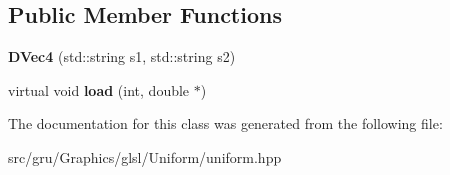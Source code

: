 \subsection*{\-Public \-Member \-Functions}
\begin{DoxyCompactItemize}
\item 
\hypertarget{classglutpp_1_1glsl_1_1Uniform_1_1Vector_1_1DVec4_a4859f3f20e00edcf417eb00811836c2b}{{\bfseries \-D\-Vec4} (std\-::string s1, std\-::string s2)}\label{classglutpp_1_1glsl_1_1Uniform_1_1Vector_1_1DVec4_a4859f3f20e00edcf417eb00811836c2b}

\item 
\hypertarget{classglutpp_1_1glsl_1_1Uniform_1_1Vector_1_1DVec4_a9edb6c47d8f5f4afb0ce1adb83a3f8bd}{virtual void {\bfseries load} (int, double $\ast$)}\label{classglutpp_1_1glsl_1_1Uniform_1_1Vector_1_1DVec4_a9edb6c47d8f5f4afb0ce1adb83a3f8bd}

\end{DoxyCompactItemize}


\-The documentation for this class was generated from the following file\-:\begin{DoxyCompactItemize}
\item 
src/gru/\-Graphics/glsl/\-Uniform/uniform.\-hpp\end{DoxyCompactItemize}
